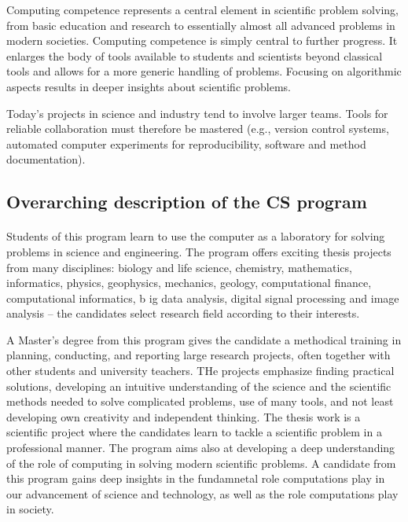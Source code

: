 \documentclass[%
oneside,                 %
final,                   %
10pt]{article}
\begin{document}
Computing competence represents a central element
in scientific problem solving, from basic education and research to
essentially almost all advanced problems in modern
societies. Computing competence is simply central to further
progress. It enlarges the body of tools available to students and
scientists beyond classical tools and allows for a more generic
handling of problems. Focusing on algorithmic aspects results in
deeper insights about scientific problems.

Today's projects in science and industry tend to involve larger teams. Tools for reliable collaboration must therefore be mastered (e.g., version control systems, automated computer experiments for reproducibility, software and method documentation).



\subsection*{Overarching description of the CS program}

\paragraph{}
Students of this program learn to use the computer as a laboratory for
solving problems in science and engineering. The program offers
exciting thesis projects from many disciplines: biology and life
science, chemistry, mathematics, informatics, physics, geophysics,
mechanics, geology, computational finance, computational informatics, b
ig data analysis, digital signal processing
and image analysis – the candidates select research field according to
their interests.

A Master’s degree from this program gives the candidate a methodical
training in planning, conducting, and reporting large research
projects, often together with other students and university teachers.
THe projects emphasize finding practical solutions, developing an
intuitive understanding of the science and the scientific methods
needed to solve complicated problems, use of many tools, and not least
developing own creativity and independent thinking. The thesis
work is a scientific project where the candidates learn to tackle a
scientific problem in a professional manner.   The program aims also at
developing a deep understanding of the role of computing in solving modern scientific
problems. A candidate from this program gains  deep insights in the fundamnetal role
computations play  in our advancement of science and technology, as well as the role computations play  in society.
\end{document}
